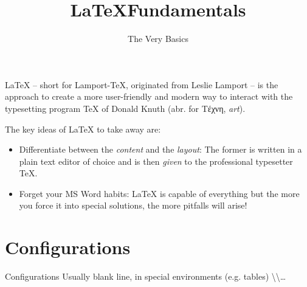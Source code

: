 

\title{\LaTeX Fundamentals}
\subtitle{The Very Basics}
\date{}



\pagestyle{empty}
\backgroundframe
\maketitle

\LaTeX{} -- short for Lamport-\TeX{}, originated from Leslie Lamport -- is the approach to create a more user-friendly and modern way to interact with the typesetting program \TeX{} of Donald Knuth (abr. for \textgreek{Τέχνη}, \textit{art}).
%

%
The key ideas of \LaTeX{} to take away are:
%
\begin{itemize}
  \item Differentiate between the \textit{content} and the \textit{layout}: The former is written in a plain text editor of choice and is then \textit{given} to the professional typesetter \TeX{}.
  \item Forget your MS Word habits: \LaTeX{} is capable of everything but the more you force it into special solutions, the more pitfalls will arise!
\end{itemize}

\section*{Configurations}
%
Configurations
Usually blank line, in special environments (e.g. tables) \textbackslash\textbackslash \ldots




